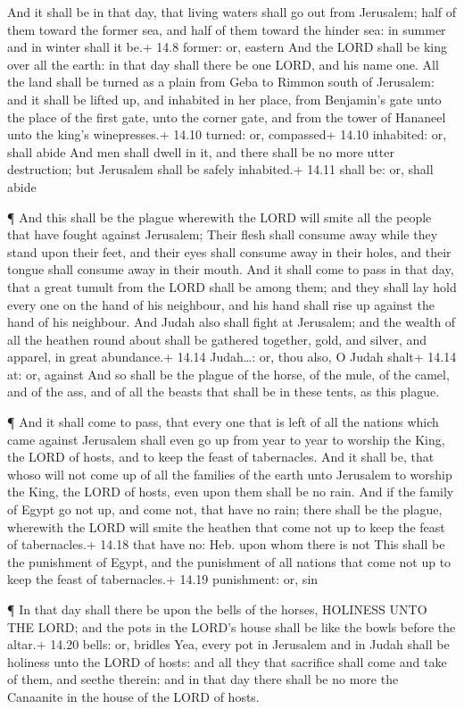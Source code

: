  And it shall be in that day, that living waters shall go
out from Jerusalem; half of them toward the former sea, and half of them
toward the hinder sea: in summer and in winter shall it be.+ 14.8
former: or, eastern  And the LORD shall be king over all the
earth: in that day shall there be one LORD, and his name one.
 All the land shall be turned as a plain from Geba to
Rimmon south of Jerusalem: and it shall be lifted up, and inhabited in
her place, from Benjamin's gate unto the place of the first gate, unto
the corner gate, and from the tower of Hananeel unto the king's
winepresses.+ 14.10 turned: or, compassed+ 14.10 inhabited: or, shall
abide  And men shall dwell in it, and there shall be no
more utter destruction; but Jerusalem shall be safely inhabited.+ 14.11
shall be: or, shall abide

 ¶ And this shall be the plague wherewith the LORD will
smite all the people that have fought against Jerusalem; Their flesh
shall consume away while they stand upon their feet, and their eyes
shall consume away in their holes, and their tongue shall consume away
in their mouth.  And it shall come to pass in that day,
that a great tumult from the LORD shall be among them; and they shall
lay hold every one on the hand of his neighbour, and his hand shall rise
up against the hand of his neighbour.  And Judah also shall
fight at Jerusalem; and the wealth of all the heathen round about shall
be gathered together, gold, and silver, and apparel, in great
abundance.+ 14.14 Judah\ldots: or, thou also, O Judah shalt+ 14.14 at:
or, against  And so shall be the plague of the horse, of
the mule, of the camel, and of the ass, and of all the beasts that shall
be in these tents, as this plague.

 ¶ And it shall come to pass, that every one that is left
of all the nations which came against Jerusalem shall even go up from
year to year to worship the King, the LORD of hosts, and to keep the
feast of tabernacles.  And it shall be, that whoso will not
come up of all the families of the earth unto Jerusalem to worship the
King, the LORD of hosts, even upon them shall be no rain. 
And if the family of Egypt go not up, and come not, that have no rain;
there shall be the plague, wherewith the LORD will smite the heathen
that come not up to keep the feast of tabernacles.+ 14.18 that have no:
Heb. upon whom there is not  This shall be the punishment
of Egypt, and the punishment of all nations that come not up to keep the
feast of tabernacles.+ 14.19 punishment: or, sin

 ¶ In that day shall there be upon the bells of the horses,
HOLINESS UNTO THE LORD; and the pots in the LORD's house shall be like
the bowls before the altar.+ 14.20 bells: or, bridles  Yea,
every pot in Jerusalem and in Judah shall be holiness unto the LORD of
hosts: and all they that sacrifice shall come and take of them, and
seethe therein: and in that day there shall be no more the Canaanite in
the house of the LORD of hosts.
